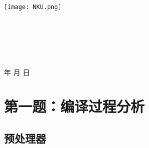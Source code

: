 \documentclass[a4paper]{article}
\newcommand{\HRule}{\rule{\linewidth}{0.5mm}}%
\begin{document}
\renewcommand{\contentsname}{目\ 录}
\renewcommand{\appendixname}{附录}
\renewcommand{\appendixpagename}{附录}
\renewcommand{\refname}{参考文献} 
\renewcommand{\figurename}{图}
\renewcommand{\tablename}{表}
\renewcommand{\today}{\number\year 年 \number\month 月 \number\day 日}

\begin{titlepage}
    \begin{center}
    \texttt{[image: NKU.png]}\\[1cm]
    \vspace{20mm}
		\textbf{\huge\textbf{}}\\[0.5cm]
		\textbf{\huge{}}\\[2.3cm]
		\textbf{\Huge\textbf{}}

		\vspace{\fill}
    
    \centering
    \textsc{\LARGE {}}\\[0.5cm]
    \textsc{\LARGE {}}\\[0.5cm]
    \textsc{\LARGE {}}\\[0.5cm]
    
    \vfill
    {\Large \today}
    \end{center}
\end{titlepage}

\renewcommand {\thefigure}{\thesection{}.\arabic{figure}}%
\renewcommand{\figurename}{图}
\renewcommand{\contentsname}{目录}  


\clearpage
\tableofcontents
\newpage





\section{第一题：编译过程分析}

\subsection{预处理器}
\end{document}
